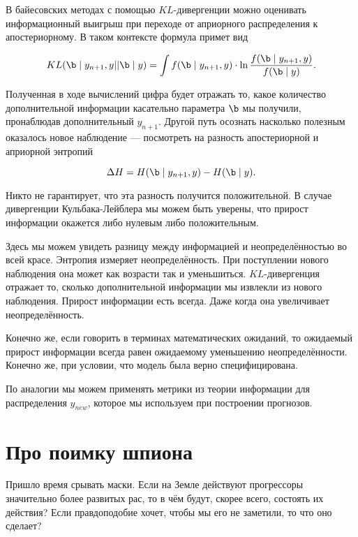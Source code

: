  
 В байесовских методах с помощью $KL$-дивергенции можно оценивать информационный выигрыш при переходе от априорного распределения к апостериорному. В таком контексте формула примет вид 
 
 \[ KL(\b \mid y_{n+1}, y || \b \mid y) =  \int f(\b \mid y_{n+1}, y) \cdot \ln \frac{f(\b \mid y_{n+1}, y)}{f(\b \mid y)}. \]

Полученная в ходе вычислений цифра будет отражать то, какое количество дополнительной информации касательно параметра $\b$ мы получили, пронаблюдав дополнительный $y_{n+1}$. Другой путь осознать насколько полезным оказалось новое наблюдение  --- посмотреть на разность апостериорной и априорной энтропий

\[ \Delta H =  H(\b \mid y_{n+1}, y) - H(\b \mid y).\]

Никто не гарантирует, что эта разность получится положительной.  В случае дивергенции Кульбака-Лейблера мы можем быть уверены, что прирост информации окажется либо нулевым либо положительным.  

Здесь мы можем увидеть разницу между информацией и неопределённостью во всей красе. Энтропия измеряет неопределённость. При поступлении нового наблюдения она может как возрасти так и уменьшиться.  $KL$-дивергенция отражает то, сколько дополнительной информации мы извлекли из нового наблюдения. Прирост информации есть всегда. Даже когда она увеличивает неопределённость. 

Конечно же, если говорить в терминах математических ожиданий, то ожидаемый прирост информации всегда равен ожидаемому уменьшению неопределённости.  Конечно же, при условии, что модель была верно специфицирована.  

По аналогии мы можем применять метрики из теории информации для распределения $y_{new}$, которое мы используем при построении прогнозов.


\section{Про поимку шпиона} 

Пришло время срывать маски.  Если на Земле действуют прогрессоры значительно более развитых рас, то в чём будут, скорее всего, состоять их действия? Если правдоподобие хочет, чтобы мы его не заметили, то что оно сделает?

